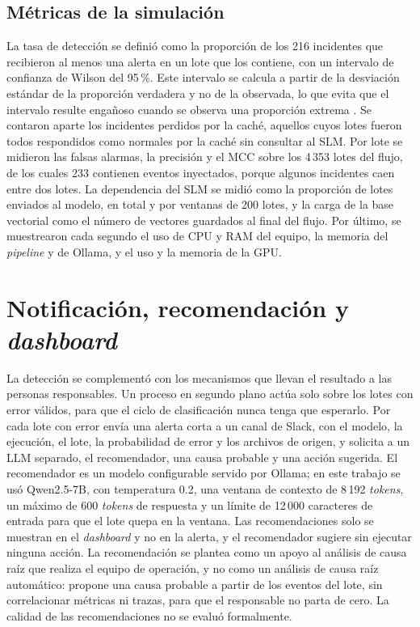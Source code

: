 \subsection{Métricas de la simulación}

La tasa de detección se definió como la proporción de los 216 incidentes que recibieron al menos una alerta en un lote que los contiene, con un intervalo de confianza de Wilson del 95\,\%. Este intervalo se calcula a partir de la desviación estándar de la proporción verdadera y no de la observada, lo que evita que el intervalo resulte engañoso cuando se observa una proporción extrema \cite{wilson1927_probable}. Se contaron aparte los incidentes perdidos por la caché, aquellos cuyos lotes fueron todos respondidos como normales por la caché sin consultar al SLM. Por lote se midieron las falsas alarmas, la precisión y el MCC sobre los 4\,353 lotes del flujo, de los cuales 233 contienen eventos inyectados, porque algunos incidentes caen entre dos lotes. La dependencia del SLM se midió como la proporción de lotes enviados al modelo, en total y por ventanas de 200 lotes, y la carga de la base vectorial como el número de vectores guardados al final del flujo. Por último, se muestrearon cada segundo el uso de CPU y RAM del equipo, la memoria del \textit{pipeline} y de Ollama, y el uso y la memoria de la GPU.

\section{Notificación, recomendación y \textit{dashboard}}\label{sec:met_notificacion}\label{sec:met_dashboard}

La detección se complementó con los mecanismos que llevan el resultado a las personas responsables. Un proceso en segundo plano actúa solo sobre los lotes con error válidos, para que el ciclo de clasificación nunca tenga que esperarlo. Por cada lote con error envía una alerta corta a un canal de Slack, con el modelo, la ejecución, el lote, la probabilidad de error y los archivos de origen, y solicita a un LLM separado, el recomendador, una causa probable y una acción sugerida. El recomendador es un modelo configurable servido por Ollama; en este trabajo se usó Qwen2.5-7B, con temperatura 0.2, una ventana de contexto de 8\,192 \textit{tokens}, un máximo de 600 \textit{tokens} de respuesta y un límite de 12\,000 caracteres de entrada para que el lote quepa en la ventana. Las recomendaciones solo se muestran en el \textit{dashboard} y no en la alerta, y el recomendador sugiere sin ejecutar ninguna acción. La recomendación se plantea como un apoyo al análisis de causa raíz que realiza el equipo de operación, y no como un análisis de causa raíz automático: propone una causa probable a partir de los eventos del lote, sin correlacionar métricas ni trazas, para que el responsable no parta de cero. La calidad de las recomendaciones no se evaluó formalmente.

